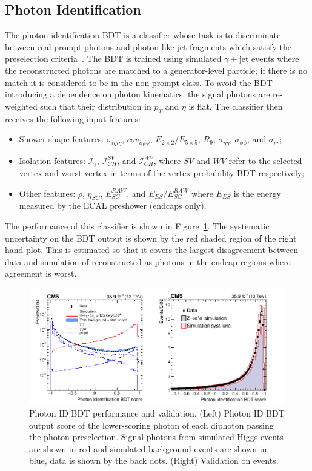 \subsection{Photon Identification}
The photon identification BDT is a classifier whose task is to discriminate between real prompt photons and photon-like jet fragments which satisfy the preselection criteria~\cite{PhotonReco}. 
The BDT is trained using simulated $\gamma + $jet events where the reconstructed photons are matched to a generator-level particle; if there is no match it is considered to be in the non-prompt class.
To avoid the BDT introducing a dependence on photon kinematics, the signal photons are re-weighted such that their distribution in $p_{T}$ and $\eta$ is flat. 
The classifier then receives the following input features:
\begin{itemize}[noitemsep]
    \item Shower shape features: $\sigma_{i\eta{}i\eta}$, $cov_{i\eta{}i\phi}$, $E_{2\times{}2}/E_{5\times{}5}$, $R_{9}$, $\sigma_{\eta\eta}$, $\sigma_{\phi\phi}$, and $\sigma_{rr}$;
    \item Isolation features: $\mathcal{I}_{\gamma}$, $\mathcal{I}_{CH}^{SV}$, and $\mathcal{I}_{CH}^{WV}$, where $SV$ and $WV$ refer to the selected vertex and worst vertex in terms of the vertex probability BDT respectively; 
    \item Other features: $\rho$, $\eta_{SC}$, $E_{SC}^{RAW}$, and $E_{ES}/E_{SC}^{RAW}$ where $E_{ES}$ is the energy measured by the ECAL preshower (endcaps only).
\end{itemize}

The performance of this classifier is shown in Figure~\ref{fig:object_reco:photon_id_bdt}. 
The systematic uncertainty on the BDT output is shown by the red shaded region of the right hand plot. This is estimated so that it covers the largest disagreement between data and simulation of \Zee reconstructed as photons in the endcap regions where agreement is worst.
\begin{figure}[h!]
    \centering
    \includegraphics[width=0.99\textwidth]{figures/object_reco/CMS-HIG-16-040_Figure_002.pdf}
    \caption{Photon ID BDT performance and validation. (Left) Photon ID BDT output score of the lower-scoring photon of each diphoton passing the photon preselection. Signal photons from simulated Higgs events are shown in red and simulated background events are shown in blue, data is shown by the back dots. (Right) Validation on \Zee events.}
        \label{fig:object_reco:photon_id_bdt}
\end{figure}


